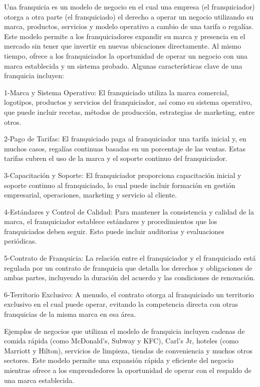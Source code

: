\documentclass[
  us-letterpaper,
]{scrreprt}
\theoremstyle{definition}
\theoremstyle{plain}
\theoremstyle{plain}
\theoremstyle{remark}
\begin{document}
Una franquicia es un modelo de negocio en el cual una empresa (el
franquiciador) otorga a otra parte (el franquiciado) el derecho a operar
un negocio utilizando su marca, productos, servicios y modelo operativo
a cambio de una tarifa o regalías. Este modelo permite a los
franquiciadores expandir su marca y presencia en el mercado sin tener
que invertir en nuevas ubicaciones directamente. Al mismo tiempo, ofrece
a los franquiciados la oportunidad de operar un negocio con una marca
establecida y un sistema probado. Algunas características clave de una
franquicia incluyen:

1-Marca y Sistema Operativo: El franquiciado utiliza la marca comercial,
logotipos, productos y servicios del franquiciador, así como su sistema
operativo, que puede incluir recetas, métodos de producción, estrategias
de marketing, entre otros.

2-Pago de Tarifas: El franquiciado paga al franquiciador una tarifa
inicial y, en muchos casos, regalías continuas basadas en un porcentaje
de las ventas. Estas tarifas cubren el uso de la marca y el soporte
continuo del franquiciador.

3-Capacitación y Soporte: El franquiciador proporciona capacitación
inicial y soporte continuo al franquiciado, lo cual puede incluir
formación en gestión empresarial, operaciones, marketing y servicio al
cliente.

4-Estándares y Control de Calidad: Para mantener la consistencia y
calidad de la marca, el franquiciador establece estándares y
procedimientos que los franquiciados deben seguir. Esto puede incluir
auditorias y evaluaciones periódicas.

5-Contrato de Franquicia: La relación entre el franquiciador y el
franquiciado está regulada por un contrato de franquicia que detalla los
derechos y obligaciones de ambas partes, incluyendo la duración del
acuerdo y las condiciones de renovación.

6-Territorio Exclusivo: A menudo, el contrato otorga al franquiciado un
territorio exclusivo en el cual puede operar, evitando la competencia
directa con otras franquicias de la misma marca en esa área.

Ejemplos de negocios que utilizan el modelo de franquicia incluyen
cadenas de comida rápida (como McDonald's, Subway y KFC), Carl's Jr,
hoteles (como Marriott y Hilton), servicios de limpieza, tiendas de
conveniencia y muchos otros sectores. Este modelo permite una expansión
rápida y eficiente del negocio mientras ofrece a los emprendedores la
oportunidad de operar con el respaldo de una marca establecida.
\end{document}
